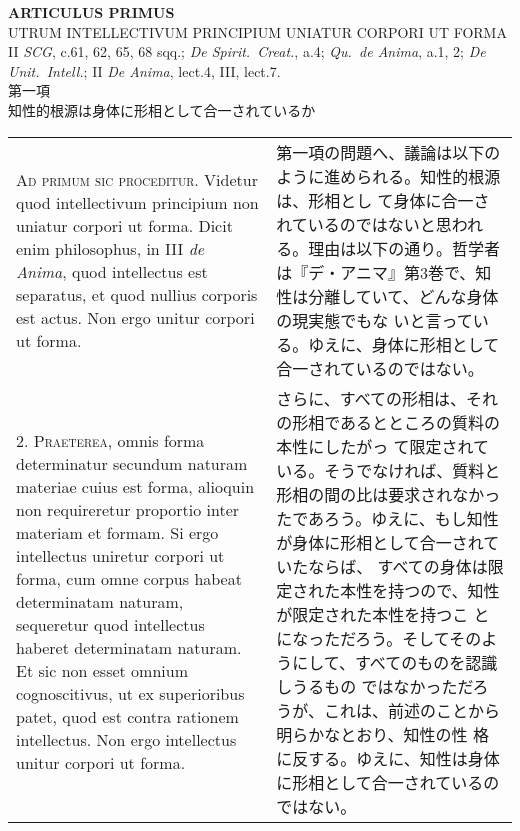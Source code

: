 \documentclass[paper=a4paper,fontsize=10pt,jafontsize=9pt,titlepage]{jlreq}
\begin{document}
\begin{center}
{\Large {\bfseries ARTICULUS PRIMUS}}\\
{\large UTRUM INTELLECTIVUM PRINCIPIUM UNIATUR CORPORI UT FORMA}\\
{\footnotesize II {\itshape SCG}, c.61, 62, 65, 68 sqq.; {\itshape De Spirit.~Creat.}, a.4; {\itshape Qu.~de Anima}, a.1, 2; {\itshape De Unit.~Intell.}; II {\itshape De Anima}, lect.4, III, lect.7.}\\
{\Large 第一項\\知性的根源は身体に形相として合一されているか}
\end{center}

\begin{longtable}{p{21em}p{21em}}
{\scshape Ad primum sic proceditur}. Videtur quod intellectivum
principium non uniatur corpori ut forma. Dicit enim philosophus, in
III {\itshape de Anima}, quod intellectus est separatus, et quod
nullius corporis est actus. Non ergo unitur corpori ut forma.
 
&

 第一項の問題へ、議論は以下のように進められる。知性的根源は、形相とし
 て身体に合一されているのではないと思われる。理由は以下の通り。哲学者
 は『デ・アニマ』第3巻で、知性は分離していて、どんな身体の現実態でもな
 いと言っている。ゆえに、身体に形相として合一されているのではない。
 
\\


2. {\scshape Praeterea}, omnis forma determinatur secundum naturam
materiae cuius est forma, alioquin non requireretur proportio inter
materiam et formam. Si ergo intellectus uniretur corpori ut forma, cum
omne corpus habeat determinatam naturam, sequeretur quod intellectus
haberet determinatam naturam. Et sic non esset omnium cognoscitivus,
ut ex superioribus patet, quod est contra rationem intellectus. Non
ergo intellectus unitur corpori ut forma.
 
&

 さらに、すべての形相は、それの形相であるとところの質料の本性にしたがっ
 て限定されている。そうでなければ、質料と形相の間の比は要求されなかっ
 たであろう。ゆえに、もし知性が身体に形相として合一されていたならば、
 すべての身体は限定された本性を持つので、知性が限定された本性を持つこ
 とになっただろう。そしてそのようにして、すべてのものを認識しうるもの
 ではなかっただろうが、これは、前述のことから明らかなとおり、知性の性
 格に反する。ゆえに、知性は身体に形相として合一されているのではない。
 
\\


\end{longtable}
\end{document}
